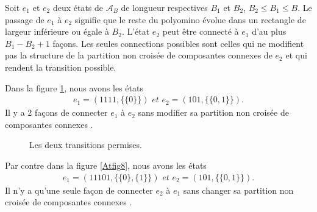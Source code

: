 Soit $e_{1}$ et $e_{2}$ deux états de $\mathcal{A}_{B}$ de longueur respectives  $B_{1}$ et $B_{2}$, $B_{2}\leq B_{1} \leq B$. Le passage de $e_{1}$ à $e_{2}$ signifie que le reste du polyomino évolue dans un rectangle  de largeur inférieure ou égale à $B_{2}$. L'état $e_{2}$ peut être connecté à $e_{1}$ d'au plus $B_{1}-B_{2}+1$ façons. Les seules connections possibles sont  celles qui ne modifient pas la structure  de la partition non croisée de composantes connexes   de $e_{2}$ et qui rendent la transition possible.
\begin{Ex}\label{ex7}
Dans la figure \ref{Atfig7}, nous avons les états 
\begin{eqnarray*}
e_{1}=(1111,\{\{0\}\})\textit{ et } e_{2}=(101,\{\{0,1\}\}). 
\end{eqnarray*}
Il y a  $2$ façons de connecter $e_{1}$ à $e_{2}$ sans modifier sa partition non croisée de composantes connexes  . 
\begin{figure}[!htb]
\begin{minipage}[c]{.10\linewidth}
  \centering
\end{minipage}\hfill
\begin{minipage}[c]{.10\linewidth}
  \centering
\begin{logicpuzzle}[rows=2,columns=4,color=cyan!100, width=750px,scale=0.5]
\framepuzzle[black!50]
\end{logicpuzzle}
\end{minipage} \hfill
\begin{minipage}[c]{.42\linewidth}
  \centering
\begin{logicpuzzle}[rows=2,columns=4,color=cyan!100, width=750px,scale=0.5]
\framepuzzle[black!50]
\end{logicpuzzle}
\end{minipage} \hfill
\caption{\label{Atfig7} Les deux transitions permises.}
\end{figure} 
Par contre dans la figure \ref{Atfig8}, nous avons les états 
\begin{eqnarray*}
e_{1}=(11101,\{\{0\},\{1\}\})\textit{ et  } e_{2}=(101,\{\{0,1\}\}). 
\end{eqnarray*}
Il n'y a qu'une seule façon de connecter $e_{2}$ à $e_{1}$ sans changer sa partition non croisée de composantes connexes  .

\end{Ex}
